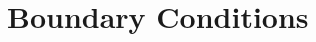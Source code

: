 \documentclass[aps,prd,amsmath,showpacs,amssymb,superscriptaddress,nofootinbib,longbibliography,eqsecnum,preprintnumbers]{revtex4-1}
\newcommand{\zach}[1]{\textcolor{ForestGreen}{#1}}
\begin{document}
\section{Boundary Conditions}
\label{sec:BC}

%
%
%


\end{document}
